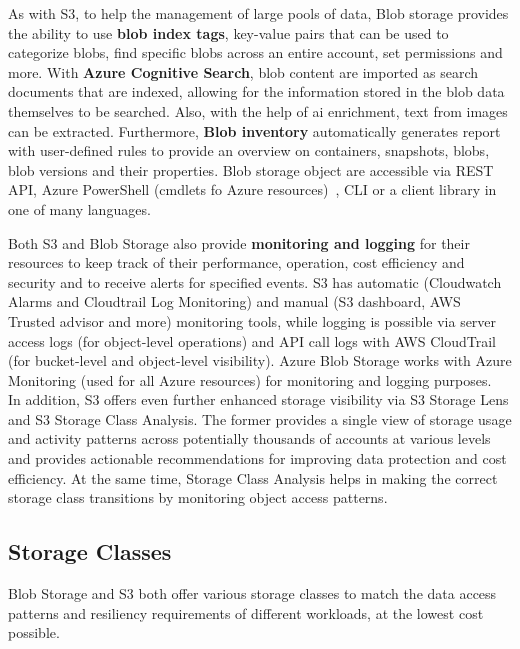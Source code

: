 As with S3, to help the management of large pools of data, Blob storage provides the ability to use \textbf{blob index tags}, key-value pairs that can be used to categorize blobs, find specific blobs across an entire account, set permissions and more. With \textbf{Azure Cognitive Search}, blob content are imported as search documents that are indexed, allowing for the information stored in the blob data themselves to be searched. Also, with the help of \ac{ai} enrichment, text from images can be extracted. Furthermore,  \textbf{Blob inventory} automatically generates report with user-defined rules to provide an overview on containers, snapshots, blobs, blob versions and their properties. Blob storage object are accessible via REST API, Azure PowerShell (cmdlets fo Azure resources)~\cite{powershell}, CLI or a client library in one of many languages.~\cite{blobinfo}

Both S3 and Blob Storage also provide\textbf{ monitoring and logging} for their resources to keep track of their performance, operation, cost efficiency and security and to receive alerts for specified events. S3 has automatic (Cloudwatch Alarms and Cloudtrail Log Monitoring) and manual (S3 dashboard, AWS Trusted advisor and more) monitoring tools, while logging is possible via server access logs (for object-level operations) and API call logs with AWS CloudTrail (for bucket-level and object-level visibility). Azure Blob Storage works with Azure Monitoring (used for all Azure resources) for monitoring and logging purposes.~\cite{s3monitoring,blobmonitoring} In addition, S3 offers even further enhanced storage visibility via S3 Storage Lens and S3 Storage Class Analysis. The former provides a single view of storage usage and activity patterns across potentially thousands of accounts at various levels and provides actionable recommendations for improving data protection and cost efficiency. At the same time, Storage Class Analysis helps in making the correct storage class transitions by monitoring object access patterns.~\cite{s3analytics}

\subsection{Storage Classes}
Blob Storage and S3 both offer various storage classes to match the data access patterns and resiliency requirements of different workloads, at the lowest cost possible.

